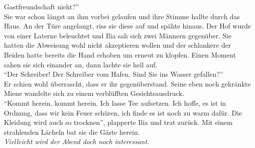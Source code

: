 Gastfreundschaft nicht?'' \\
Sie war schon längst an ihm vorbei gelaufen und ihre Stimme hallte durch das Haus. An der Türe 
angelangt, riss sie diese auf und spähte hinaus. Der Hof wurde von einer Laterne beleuchtet und Ilia 
sah sich zwei Männern gegenüber. Sie hatten die Abweisung wohl nicht akzeptieren wollen und der 
schlankere der Beiden hatte bereits die Hand erhoben um erneut zu klopfen. Einen Moment sahen sie 
sich einander an, dann lachte sie hell auf. \\
``Der Schreiber! Der Schreiber vom Hafen. Sind Sie ins Wasser gefallen?'' \\
Er schien wohl überrascht, dass er ihr gegenüberstand. Seine eben noch 
gekränkte Miene wandelte sich zu einem verblüfften Gesichtsausdruck. \\
``Kommt herein, kommt herein. Ich lasse Tee aufsetzen. Ich hoffe, es ist in Ordnung, dass wir kein 
Feuer schüren, ich finde es ist noch zu warm dafür. Die Kleidung wird auch so trocknen'', plapperte 
Ilia und trat zurück. Mit einem strahlenden Lächeln bat sie die Gäste herein. \\
\textit{Vielleicht wird der Abend doch noch interessant.}